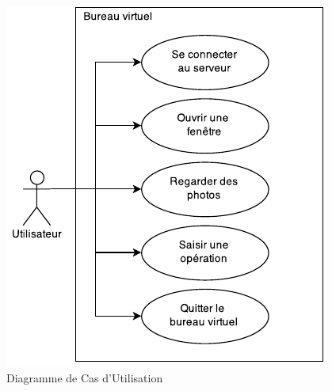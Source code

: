 \begin{figure}[H]
	\centering
	\includegraphics{diagrammes/DCU.pdf}
	\caption{Diagramme de Cas d'Utilisation}
\end{figure}